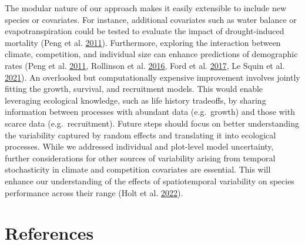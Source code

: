 \documentclass[12pt]{article}
\begin{document}
The modular nature of our approach makes it easily extensible to include
new species or covariates. For instance, additional covariates such as
water balance or evapotranspiration could be tested to evaluate the
impact of drought-induced mortality (Peng et al.
\protect\hyperlink{ref-Peng2011}{2011}). Furthermore, exploring the
interaction between climate, competition, and individual size can
enhance predictions of demographic rates (Peng et al.
\protect\hyperlink{ref-Peng2011}{2011}, Rollinson et al.
\protect\hyperlink{ref-Rollinson2016}{2016}, Ford et al.
\protect\hyperlink{ref-Ford2017}{2017}, Le Squin et al.
\protect\hyperlink{ref-LeSquin2021}{2021}). An overlooked but
computationally expensive improvement involves jointly fitting the
growth, survival, and recruitment models. This would enable leveraging
ecological knowledge, such as life history tradeoffs, by sharing
information between processes with abundant data (e.g.~growth) and those
with scarce data (e.g.~recruitment). Future steps should focus on better
understanding the variability captured by random effects and translating
it into ecological processes. While we addressed individual and
plot-level model uncertainty, further considerations for other sources
of variability arising from temporal stochasticity in climate and
competition covariates are essential. This will enhance our
understanding of the effects of spatiotemporal variability on species
performance across their range (Holt et al.
\protect\hyperlink{ref-Holt2022}{2022}).

\hypertarget{references}{%
\section*{References}\label{references}}
\end{document}
